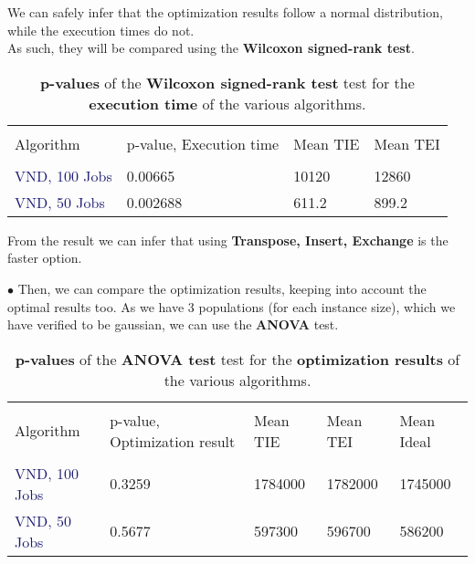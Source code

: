 \documentclass[
12pt,
a4paper,
oneside,
headinclude,
footinclude]{article}
\theoremstyle{definition} %
\begin{document}
We can safely infer that the optimization results follow a normal distribution, while the execution times do not.\\
As such, they will be compared using the \textbf{Wilcoxon signed-rank test}.

\begin{table}[H]
    \centering %
    \begin{tabular}{l l l l} %
        \hline
        \hline 
        \\[-1.5ex]
        \textcolor{BrickRed}{Algorithm} & \textcolor{BrickRed}{p-value, Execution time} & \textcolor{BrickRed}{Mean TIE} & \textcolor{BrickRed}{Mean TEI}\\ [0.5ex]
        \hline %
        \\[-1.5ex]
        \textcolor{MidnightBlue}{VND, 100 Jobs}  & 0.00665 & 10120 & 12860\\
        \textcolor{MidnightBlue}{VND, 50 Jobs}   & 0.002688  & 611.2 &  899.2  
        \\[1ex] %
        \hline %
    \end{tabular}
    \caption{\label{tab:vnd-exec}\textbf{p-values} of the \textbf{Wilcoxon signed-rank test} test for the \textbf{execution time} of the various algorithms.}
\end{table} 

From the result we can infer that using \textbf{Transpose, Insert, Exchange} is the faster option.

$\bullet$ Then, we can compare the optimization results, keeping into account the optimal results too. As we have 3 populations (for each instance size), which we have verified to be gaussian, we can use the \textbf{ANOVA} test.

\begin{table}[H]
    \centering %
    \begin{tabular}{l l l l l} %
        \hline
        \hline 
        \\[-1.5ex]
        \textcolor{BrickRed}{Algorithm} & \textcolor{BrickRed}{p-value, Optimization result} & \textcolor{BrickRed}{Mean TIE} & \textcolor{BrickRed}{Mean TEI} & \textcolor{BrickRed}{Mean Ideal}\\ [0.5ex]
        \hline %
        \\[-1.5ex]
        \textcolor{MidnightBlue}{VND, 100 Jobs}  & 0.3259 & 1784000 & 1782000 & 1745000\\
        \textcolor{MidnightBlue}{VND, 50 Jobs}   & 0.5677  & 597300 &  596700 & 586200  
        \\[1ex] %
        \hline %
    \end{tabular}
    \caption{\label{tab:vnd-res}\textbf{p-values} of the \textbf{ANOVA test} test for the \textbf{optimization results} of the various algorithms.}
\end{table} 
\end{document}

